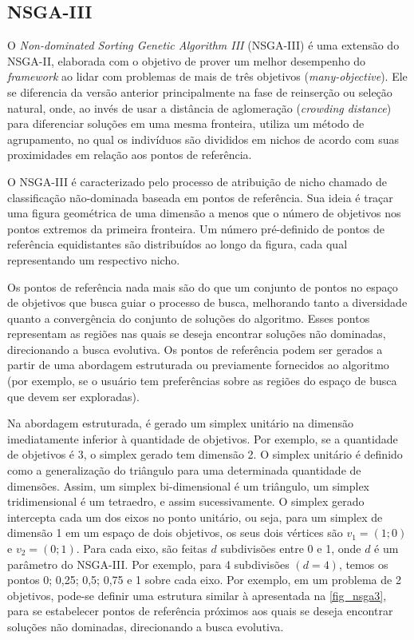 \FloatBarrier
\subsection{NSGA-III}

O \textit{Non-dominated Sorting Genetic Algorithm III} (NSGA-III) \cite{Deb2014} é uma extensão do NSGA-II, elaborada com o objetivo de prover um melhor desempenho do \textit{framework} ao lidar com problemas de mais de três objetivos (\textit{many-objective}). Ele se diferencia da versão anterior principalmente na fase de reinserção ou seleção natural, onde, ao invés de usar a distância de aglomeração (\textit{crowding distance}) para diferenciar soluções em uma mesma fronteira, utiliza um método de agrupamento, no qual os indivíduos são divididos em nichos de acordo com suas proximidades em relação aos pontos de referência.

O NSGA-III é caracterizado pelo processo de atribuição de nicho chamado de classificação não-dominada baseada em pontos de referência. Sua ideia é traçar uma figura geométrica de uma dimensão a menos que o número de objetivos nos pontos extremos da primeira fronteira. Um número pré-definido de pontos de referência equidistantes são distribuídos ao longo da figura, cada qual representando um respectivo nicho.

Os pontos de referência nada mais são do que um conjunto de pontos no espaço de objetivos que busca guiar o processo de busca, melhorando tanto a diversidade quanto a convergência do conjunto de soluções do algoritmo. Esses pontos representam as regiões nas quais se deseja encontrar soluções não dominadas, direcionando a busca evolutiva. Os pontos de referência podem ser gerados a partir de uma abordagem estruturada ou previamente fornecidos ao algoritmo (por exemplo, se o usuário tem preferências sobre as regiões do espaço de busca que devem ser exploradas). 

Na abordagem estruturada, é gerado um simplex unitário na dimensão imediatamente inferior à quantidade de objetivos. Por exemplo, se a quantidade de objetivos é 3, o simplex gerado tem dimensão 2. O simplex unitário é definido como a generalização do triângulo para uma determinada quantidade de dimensões. Assim, um simplex bi-dimensional é um triângulo, um simplex tridimensional é um tetraedro, e assim sucessivamente. O simplex gerado intercepta cada um dos eixos no ponto unitário, ou seja, para um simplex de dimensão 1 em um espaço de dois objetivos, os seus dois vértices são $v_1 = (1;0)$ e $v_2 = (0;1)$. Para cada eixo, são feitas $d$ subdivisões entre 0 e 1, onde $d$ é um parâmetro do NSGA-III.  Por exemplo, para 4 subdivisões $(d = 4)$, temos os pontos 0; 0,25; 0,5; 0,75 e 1 sobre cada eixo. Por exemplo, em um problema de 2 objetivos, pode-se definir uma estrutura similar à apresentada na \autoref{fig_nsga3}, para se estabelecer pontos de referência próximos aos quais se deseja encontrar soluções não dominadas, direcionando a busca evolutiva.

